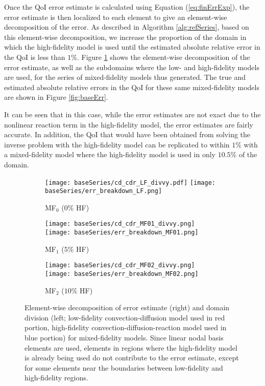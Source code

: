 Once the QoI error estimate is calculated using Equation (\ref{eq:finErrExp}), the error estimate is then localized to each element to give an element-wise decomposition of the error. As described in Algorithm \ref{alg:refSeries}, based on this element-wise decomposition, we increase the proportion of the domain in which the high-fidelity model is used until the estimated absolute relative error in the QoI is less than $1\%$. Figure \ref{fig:baseRef} shows the element-wise decomposition of the error estimate, as well as the subdomains where the low- and high-fidelity models are used, for the series of mixed-fidelity models thus generated. The true and estimated absolute relative errors in the QoI for these same mixed-fidelity models are shown in Figure \ref{fig:baseErr}.

It can be seen that in this case, while the error estimates are not exact due to the nonlinear reaction term in the high-fidelity model, the error estimates are fairly accurate. In addition, the QoI that would have been obtained from solving the inverse problem with the high-fidelity model can be replicated to within $1\%$ with a mixed-fidelity model where the high-fidelity model is used in only $10.5\%$ of the domain.

\begin{figure}[h!]
\centering
  \begin{subfigure}[b]{\textwidth}
  \centering
    \texttt{[image: baseSeries/cd\_cdr\_LF\_divvy.pdf]}
    \texttt{[image: baseSeries/err\_breakdown\_LF.png]}
    \vspace{-0.5\baselineskip}
    \caption{MF$_0$ ($0\%$ HF)}
    \vspace{0.8\baselineskip}
  \end{subfigure}
	\begin{subfigure}[b]{\textwidth}
  \centering
    \texttt{[image: baseSeries/cd\_cdr\_MF01\_divvy.png]}
    \texttt{[image: baseSeries/err\_breakdown\_MF01.png]}
    \vspace{-0.5\baselineskip}
    \caption{MF$_1$ ($5\%$ HF)}
    \vspace{0.8\baselineskip}
  \end{subfigure}
  \begin{subfigure}[b]{\textwidth}
  \centering
    \texttt{[image: baseSeries/cd\_cdr\_MF02\_divvy.png]}
    \texttt{[image: baseSeries/err\_breakdown\_MF02.png]}
    \vspace{-0.5\baselineskip}
    \caption{MF$_2$ ($10\%$ HF)}
    \vspace{0.8\baselineskip}
  \end{subfigure}
\caption{Element-wise decomposition of error estimate (right) and domain division (left; low-fidelity convection-diffusion model used in red portion, high-fidelity convection-diffusion-reaction model used in blue portion) for mixed-fidelity models. Since linear nodal basis elements are used, elements in regions where the high-fidelity model is already being used do not contribute to the error estimate, except for some elements near the boundaries between low-fidelity and high-fidelity regions.}
\label{fig:baseRef}
\end{figure}

